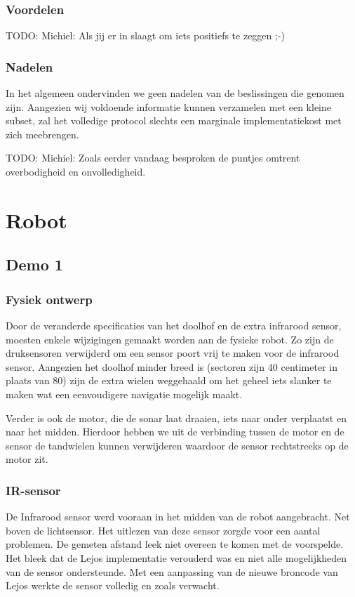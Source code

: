 \documentclass[12pt,a4paper]{report}
\begin{document}
\subsection{Voordelen}

TODO: Michiel: Als jij er in slaagt om iets positiefs te zeggen ;-)

\subsection{Nadelen}

In het algemeen ondervinden we geen nadelen van de beslissingen die genomen zijn. Aangezien wij voldoende informatie kunnen verzamelen met een kleine subset, zal het volledige protocol slechts een marginale implementatiekost met zich meebrengen.

TODO: Michiel: Zoals eerder vandaag besproken de puntjes omtrent overbodigheid en onvolledigheid.

\chapter{Robot}

\section{Demo 1}

\subsection{Fysiek ontwerp}

Door de veranderde specificaties van het doolhof en de extra infrarood sensor, moesten enkele wijzigingen gemaakt worden aan de fysieke robot. Zo zijn de druksensoren verwijderd om een sensor poort vrij te maken voor de infrarood sensor. Aangezien het doolhof minder breed is (sectoren zijn 40 centimeter in plaats van 80) zijn de extra wielen weggehaald om het geheel iets slanker te maken wat een eenvoudigere navigatie mogelijk maakt.

Verder is ook de motor, die de sonar laat draaien, iets naar onder verplaatst en naar het midden. Hierdoor hebben we uit de verbinding tussen de motor en de sensor de tandwielen kunnen verwijderen waardoor de sensor rechtstreeks op de motor zit.

\subsection{IR-sensor}
De Infrarood sensor werd vooraan in het midden van de robot aangebracht. Net boven de lichtsensor. Het uitlezen van deze sensor zorgde voor een aantal problemen. De gemeten afstand leek niet overeen te komen met de voorspelde. Het bleek dat de Lejos implementatie verouderd was en niet alle mogelijkheden van de sensor ondersteunde. Met een aanpassing van de nieuwe broncode van Lejos werkte de sensor volledig en zoals verwacht. 
\end{document}
